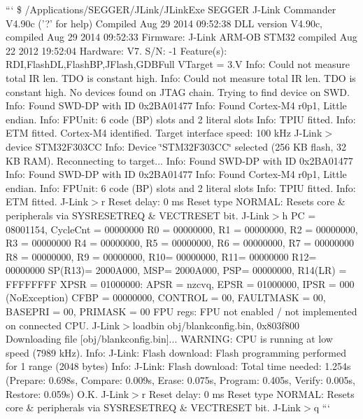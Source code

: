 ``` \$ /\+Applications/\+S\+E\+G\+G\+E\+R/\+J\+Link/\+J\+Link\+Exe S\+E\+G\+G\+E\+R J-\/\+Link Commander V4.\+90c ('?' for help) Compiled Aug 29 2014 09\+:52\+:38 D\+L\+L version V4.\+90c, compiled Aug 29 2014 09\+:52\+:33 Firmware\+: J-\/\+Link A\+R\+M-\/\+O\+B S\+T\+M32 compiled Aug 22 2012 19\+:52\+:04 Hardware\+: V7. S/\+N\+: -\/1 Feature(s)\+: R\+D\+I,Flash\+D\+L,Flash\+B\+P,J\+Flash,G\+D\+B\+Full V\+Target = 3.\+V Info\+: Could not measure total I\+R len. T\+D\+O is constant high. Info\+: Could not measure total I\+R len. T\+D\+O is constant high. No devices found on J\+T\+A\+G chain. Trying to find device on S\+W\+D. Info\+: Found S\+W\+D-\/\+D\+P with I\+D 0x2\+B\+A01477 Info\+: Found Cortex-\/\+M4 r0p1, Little endian. Info\+: F\+P\+Unit\+: 6 code (B\+P) slots and 2 literal slots Info\+: T\+P\+I\+U fitted. Info\+: E\+T\+M fitted. Cortex-\/\+M4 identified. Target interface speed\+: 100 k\+Hz J-\/\+Link$>$device S\+T\+M32\+F303\+C\+C Info\+: Device \char`\"{}\+S\+T\+M32\+F303\+C\+C\char`\"{} selected (256 K\+B flash, 32 K\+B R\+A\+M). Reconnecting to target... Info\+: Found S\+W\+D-\/\+D\+P with I\+D 0x2\+B\+A01477 Info\+: Found S\+W\+D-\/\+D\+P with I\+D 0x2\+B\+A01477 Info\+: Found Cortex-\/\+M4 r0p1, Little endian. Info\+: F\+P\+Unit\+: 6 code (B\+P) slots and 2 literal slots Info\+: T\+P\+I\+U fitted. Info\+: E\+T\+M fitted. J-\/\+Link$>$r Reset delay\+: 0 ms Reset type N\+O\+R\+M\+A\+L\+: Resets core \& peripherals via S\+Y\+S\+R\+E\+S\+E\+T\+R\+E\+Q \& V\+E\+C\+T\+R\+E\+S\+E\+T bit. J-\/\+Link$>$h P\+C = 08001154, Cycle\+Cnt = 00000000 R0 = 00000000, R1 = 00000000, R2 = 00000000, R3 = 00000000 R4 = 00000000, R5 = 00000000, R6 = 00000000, R7 = 00000000 R8 = 00000000, R9 = 00000000, R10= 00000000, R11= 00000000 R12= 00000000 S\+P(\+R13)= 2000\+A000, M\+S\+P= 2000\+A000, P\+S\+P= 00000000, R14(\+L\+R) = F\+F\+F\+F\+F\+F\+F\+F X\+P\+S\+R = 01000000\+: A\+P\+S\+R = nzcvq, E\+P\+S\+R = 01000000, I\+P\+S\+R = 000 (No\+Exception) C\+F\+B\+P = 00000000, C\+O\+N\+T\+R\+O\+L = 00, F\+A\+U\+L\+T\+M\+A\+S\+K = 00, B\+A\+S\+E\+P\+R\+I = 00, P\+R\+I\+M\+A\+S\+K = 00 F\+P\+U regs\+: F\+P\+U not enabled / not implemented on connected C\+P\+U. J-\/\+Link$>$loadbin obj/blankconfig.\+bin, 0x803f800 Downloading file \mbox{[}obj/blankconfig.\+bin\mbox{]}... W\+A\+R\+N\+I\+N\+G\+: C\+P\+U is running at low speed (7989 k\+Hz). Info\+: J-\/\+Link\+: Flash download\+: Flash programming performed for 1 range (2048 bytes) Info\+: J-\/\+Link\+: Flash download\+: Total time needed\+: 1.\+254s (Prepare\+: 0.\+698s, Compare\+: 0.\+009s, Erase\+: 0.\+075s, Program\+: 0.\+405s, Verify\+: 0.\+005s, Restore\+: 0.\+059s) O.\+K. J-\/\+Link$>$r Reset delay\+: 0 ms Reset type N\+O\+R\+M\+A\+L\+: Resets core \& peripherals via S\+Y\+S\+R\+E\+S\+E\+T\+R\+E\+Q \& V\+E\+C\+T\+R\+E\+S\+E\+T bit. J-\/\+Link$>$q ``` 